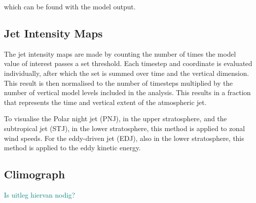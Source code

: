 which can be found with the model output. 

\subsection{Jet Intensity Maps}
The jet intensity maps are made by counting the number of times the model value of interest passes a set threshold. Each timestep and coordinate is evaluated individually, after which the set is summed over time and the vertical dimension. This result is then normalised to the number of timesteps multiplied by the number of vertical model levels included in the analysis. This results in a fraction that represents the time and vertical extent of the atmospheric jet. 

To visualise the Polar night jet (PNJ), in the upper stratosphere, and the subtropical jet (STJ), in the lower stratosphere, this method is applied to zonal wind speeds. For the eddy-driven jet (EDJ), also in the lower stratosphere, this method is applied to the eddy kinetic energy. 


\subsection{Climograph}
\textcolor{teal}{Is uitleg hiervan nodig?}